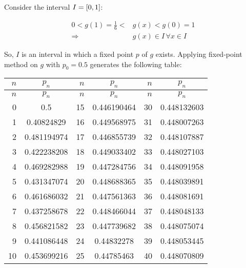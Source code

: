 \documentclass[../../../../Assignments]{subfiles}
\begin{document}
\begin{solution}
\begin{enumerate}[label = \alph*)]
            Consider the interval \(I = \interval{0}{1}\):

            \begin{align*}
                0 < g(1) = \frac{1}{6} < &g(x) < g(0) = 1 \\
                             \Rightarrow &g(x) \in I \, \forall x \in I
            \end{align*}

            So, \(I\) is an interval in which a fixed point \(p\) of \(g\)
            exists. Applying fixed-point method on \(g\) with \(p_0 =
            \num{0.5}\) generates the following table:

            \begin{longtable}{r S[table-format=1.9] r S[table-format=1.9] r S[table-format=1.9]}
                \toprule
                \(n\)  &   {\(p_n\)}   &  \(n\)  &   {\(p_n\)}   &  \(n\)  &   {\(p_n\)}   \\
                \midrule
                \endfirsthead
                \(n\)  &   {\(p_n\)}   &  \(n\)  &   {\(p_n\)}   &  \(n\)  &   {\(p_n\)}   \\
                \midrule
                  &  0.5          &     15  &  0.446190464  &     30  &  0.448132603  \\
                    1  &  0.40824829   &     16  &  0.449568975  &     31  &  0.448007263  \\
                    2  &  0.481194974  &     17  &  0.446855739  &     32  &  0.448107887  \\
                    3  &  0.422238208  &     18  &  0.449033402  &     33  &  0.448027103  \\
                    4  &  0.469282988  &     19  &  0.447284756  &     34  &  0.448091958  \\
                    5  &  0.431347074  &     20  &  0.448688365  &     35  &  0.448039891  \\
                    6  &  0.461686032  &     21  &  0.447561363  &     36  &  0.448081691  \\
                    7  &  0.437258678  &     22  &  0.448466044  &     37  &  0.448048133  \\
                    8  &  0.456821582  &     23  &  0.447739682  &     38  &  0.448075074  \\
                    9  &  0.441086448  &     24  &  0.44832278   &     39  &  0.448053445  \\
                   10  &  0.453699216  &     25  &  0.44785463   &     40  &  0.448070809  \\

\end{longtable}
\end{enumerate}
\end{solution}
\end{document}
